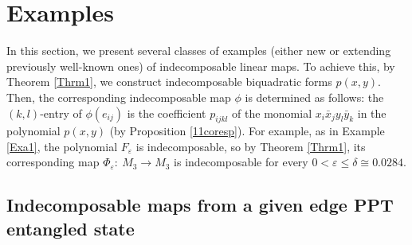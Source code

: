 \documentclass[12pt,a4paper]{amsart}
\theoremstyle{plain}
\theoremstyle{remark}
\theoremstyle{definition}
\begin{document}




\section{Examples}
In this section, we present several classes of examples (either new or extending previously well-known ones) of indecomposable linear maps. To achieve this, by Theorem \ref{Thrm1}, we construct indecomposable biquadratic forms $p(x,y)$. Then, the corresponding indecomposable map $\phi$ is determined as follows: the $(k, l)$-entry of $\phi(e_{ij})$ is the coefficient $p_{ijkl}$ of the monomial $x_i\bar{x}_jy_l\bar{y}_k$ in the polynomial $p(x,y)$ (by Proposition \ref{11coresp}). For example, as in   Example \ref{Exa1}, the polynomial  $F_{\varepsilon}$ is indecomposable, so by Theorem \ref{Thrm1}, its corresponding map $\Phi_{\varepsilon} : \ M_3 \to M_3$ is indecomposable for every $0<\varepsilon \le \delta \cong 0.0284.$ 


\subsection{Indecomposable maps from a given edge PPT entangled state}
\end{document}
